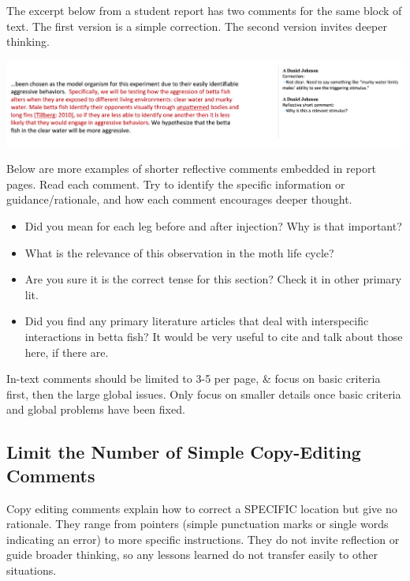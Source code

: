 \documentclass[
]{book}
\providecommand{\tightlist}{%
  \setlength{\itemsep}{0pt}\setlength{\parskip}{0pt}}
\begin{document}
The excerpt below from a student report has two comments for the same block of text. The first version is a simple correction. The second version invites deeper thinking.

\includegraphics{images/In-text-comment.png}

Below are more examples of shorter reflective comments embedded in report pages. Read each comment. Try to identify the specific information or guidance/rationale, and how each comment encourages deeper thought.

\begin{itemize}
\tightlist
\item
  Did you mean for each leg before and after injection? Why is that important?
\item
  What is the relevance of this observation in the moth life cycle?
\item
  Are you sure it is the correct tense for this section? Check it in other primary lit.
\item
  Did you find any primary literature articles that deal with interspecific interactions in betta fish? It would be very useful to cite and talk about those here, if there are.
\end{itemize}

In-text comments should be limited to 3-5 per page, \& focus on basic criteria first, then the large global issues. Only focus on smaller details once basic criteria and global problems have been fixed.

\hypertarget{limit-the-number-of-simple-copy-editing-comments}{%
\subsection{Limit the Number of Simple Copy-Editing Comments}\label{limit-the-number-of-simple-copy-editing-comments}}

Copy editing comments explain how to correct a SPECIFIC location but give no rationale. They range from pointers (simple punctuation marks or single words indicating an error) to more specific instructions. They do not invite reflection or guide broader thinking, so any lessons learned do not transfer easily to other situations.
\end{document}
